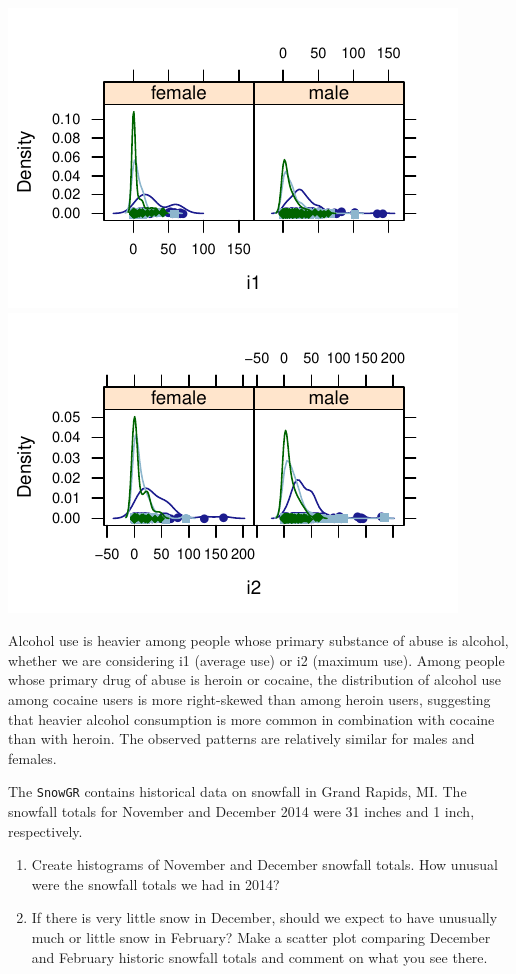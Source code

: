 \documentclass[twoside]{book}\usepackage[]{graphicx}\usepackage[]{xcolor}
\makeatletter
\def\maxwidth{ %
  \ifdim\Gin@nat@width>\linewidth
    \linewidth
  \else
    \Gin@nat@width
  \fi
}
\newenvironment{knitrout}{}{} %
\newcommand{\Rindex}[1]{\index{\texttt{#1}}}
\newcommand{\dataframe}[1]{{\color{blue!80!black}\texttt{#1}}\Rindex{#1}}
\makeatother
\begin{document}
\begin{solution}
\begin{knitrout}
{\centering \includegraphics[width=\maxwidth]{figures/fig-unnamed-chunk-37-1} 
\includegraphics[width=\maxwidth]{figures/fig-unnamed-chunk-37-2} 

}



\end{knitrout}
Alcohol use is heavier among people whose primary substance of abuse is alcohol, whether we are considering i1 (average use) or i2 (maximum use). Among people whose primary drug of abuse is heroin or cocaine, the distribution of alcohol use among cocaine users is more right-skewed than among heroin users, suggesting that heavier alcohol consumption is more common in combination with cocaine than with heroin.  The observed patterns are relatively similar for males and females.
\end{solution}

\begin{problem}
	The \dataframe{SnowGR} contains historical data on snowfall in Grand Rapids, MI.
	The snowfall totals for November and December 2014 were 31 inches and 1 inch, respectively.
	\begin{enumerate}
		\item
			Create histograms of November and December snowfall totals.  How unusual were the snowfall totals we had in 2014?
		\item
			If there is very little snow in December, should we expect to have unusually much
			or little snow in February?  Make a scatter plot comparing December and February
			historic snowfall totals and comment on what you see there.
	\end{enumerate}
\end{problem}
\end{document}
